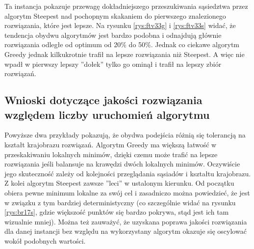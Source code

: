 Ta instancja pokazuje przewagę dokładniejszego przeszukiwania sąsiedztwa przez algorytm Steepest nad pochopnym skakaniem do pierwszego znalezionego rozwiązania, które jest lepsze. Na rysunku \ref{rys:ftv33g} i \ref{rys:ftv33s} widać, że tendencja obydwu algorytmów jest bardzo podobna i odnajdują głównie rozwiązania odległe od optimum od 20\% do 50\%. Jednak co ciekawe algorytm Greedy jednak kilkukrotnie trafił na lepsze rozwiązania niż Steepest. A więc nie wpadł w pierwszy lepszy ''dołek'' tylko go ominął i trafił na lepszy zbiór rozwiązań.

\subsection{Wnioski dotyczące jakości rozwiązania względem liczby uruchomień algorytmu}
Powyższe dwa przykłady pokazują, że obydwa podejścia różnią się tolerancją na kształt krajobrazu rozwiązań. Algorytm Greedy ma większą łatwość w przeskakiwaniu lokalnych minimów, dzięki czemu może trafić na lepsze rozwiązania jeśli balansuje na krawędzi dwóch lokalnych minimów. Oczywiście jego skuteczność zależy od kolejności przeglądania sąsiadów i kształtu krajobrazu. Z kolei algorytm Steepest zawsze ''leci'' w ustalonym kierunku. Od początku obiera pewne minimum lokalne za swój cel i zasadniczo można powiedzieć, że jest w związku z tym bardziej deterministyczny (co szczególnie widać na rysunku \ref{rys:br17s}, gdzie większość punktów się bardzo pokrywa, stąd jest ich tam wizualnie mniej). Można też zauważyć, że uzyskana poprawa jakości rozwiązania dla danej instancji bez względu na wykorzystany algorytm okazuje się oscylować wokół podobnych wartości.